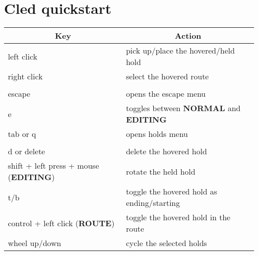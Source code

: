\chapter{Cled quickstart}\label{apx:cled}

\begin{table}[H]
\begin{tabular}{@{}ll@{}}
\toprule
\multicolumn{1}{c}{\textbf{Key}}     & \multicolumn{1}{c}{\textbf{Action}}           \\ \midrule
left click                           & pick up/place the hovered/held hold           \\
right click                          & select the hovered route                      \\
                                     &                                               \\
escape                               & opens the escape menu                         \\
e                                    & toggles between \textbf{NORMAL} and \textbf{EDITING}\\
tab or q                             & opens holds menu                              \\
                                     &                                               \\
d or delete                          & delete the hovered hold                       \\
shift + left press + mouse (\textbf{EDITING}) & rotate the held hold                          \\
t/b                                  & toggle the hovered hold as ending/starting    \\
control + left click (\textbf{ROUTE})         & toggle the hovered hold in the route \\
wheel up/down                        & cycle the selected holds                      \\ \bottomrule
\end{tabular}
\label{The editor key bindings.}
\end{table}

